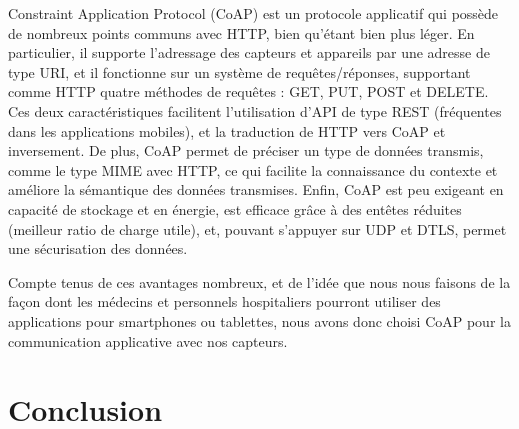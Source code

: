 \documentclass{article}
\begin{document}
Constraint Application Protocol (CoAP) est un protocole applicatif qui possède de nombreux points communs avec HTTP, bien qu’étant bien plus léger. En particulier, il supporte l’adressage des capteurs et appareils par une adresse de type URI, et il fonctionne sur un système de requêtes/réponses, supportant comme HTTP quatre méthodes de requêtes : GET, PUT, POST et DELETE. Ces deux caractéristiques facilitent l’utilisation d’API de type REST (fréquentes dans les applications mobiles), et la traduction de HTTP vers CoAP et inversement. De plus, CoAP permet de préciser un type de données transmis, comme le type MIME avec HTTP, ce qui facilite la connaissance du contexte et améliore la sémantique des données transmises. Enfin, CoAP est peu exigeant en capacité de stockage et en énergie, est efficace grâce à des entêtes réduites (meilleur ratio de charge utile), et, pouvant s’appuyer sur UDP et DTLS, permet une sécurisation des données.

Compte tenus de ces avantages nombreux, et de l’idée que nous nous faisons de la façon dont les médecins et personnels hospitaliers pourront utiliser des applications pour smartphones ou tablettes, nous avons donc choisi CoAP pour la communication applicative avec nos capteurs.


\section{ Conclusion }
 







\end{document}
